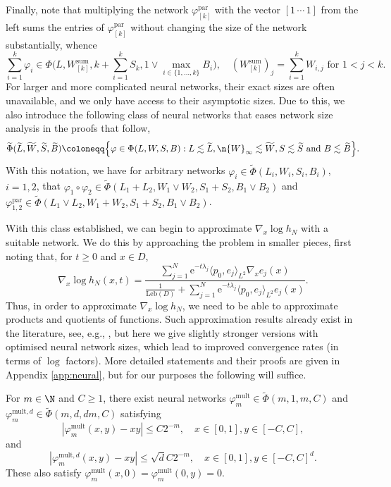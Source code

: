 \documentclass[a4paper, 11pt, headings = small, abstract]{scrartcl}
\begin{document}
Finally, note that multiplying the network $\varphi^{\mathrm{par}}_{[k]}$ with the vector $[1\, \cdots\, 1]$ from the left sums the entries of $\varphi^{\mathrm{par}}_{[k]}$ without changing the size of the network substantially, whence
\[
        \sum_{i=1}^k\varphi_i\in\Phi\Big(L, W^\mathrm{sum}_{[k]}, k+\sum_{i=1}^{k}S_k, 1\vee\max_{i\in\{1, \ldots, k\}}B_i\Big),
	\quad (W_{[k]}^\mathrm{sum})_j=\sum_{i=1}^{k}W_{i, j}\text{ for }1<j<k.
\]
For larger and more complicated neural networks, their exact sizes are often unavailable, and we only have access to their asymptotic sizes.
Due to this, we also introduce the following class of neural networks that eases network size analysis in the proofs that follow,
\[
    \widetilde{\Phi}(\widetilde{L}, \widetilde{W}, \widetilde{S}, \widetilde{B})
    \coloneqq \Big\{\varphi\in\Phi(L, W, S, B): L\lesssim\widetilde{L}, \n{W}_{\infty}\lesssim\widetilde{W}, S\lesssim\widetilde{S}\text{ and }B\lesssim\widetilde{B}\Big\}.
\]
With this notation, we have for arbitrary networks $\varphi_i\in\widetilde{\Phi}(L_i, W_i, S_i, B_i)$, $i=1,2$, that $\varphi_1\circ\varphi_2\in\widetilde{\Phi}(L_1+L_2, W_1\vee W_2, S_1+S_2, B_1\vee B_2)$ and $\varphi_{1, 2}^{\mathrm{par}}\in\widetilde{\Phi}(L_1\vee L_2, W_1+W_2, S_1+S_2, B_1\vee B_2)$.

With this class established, we can begin to approximate $\nabla_x\log h_N$ with a suitable network.
We do this by approaching the problem in smaller pieces, first noting that, for $t\ge0$ and $x\in D$,
\[
	\nabla_x\log h_N(x,t)
	=\frac{\sum_{j=1}^{N}\mathrm{e}^{-t\lambda_j}\langle p_0, e_j\rangle_{L^2}\nabla_xe_j(x)}{\frac{1}{\mathrm{Leb}(D)}+\sum_{j=1}^{N}\mathrm{e}^{-t\lambda_j}\langle p_0, e_j\rangle_{L^2} e_j(x)}.
\]
Thus, in order to approximate $\nabla_x\log h_N$, we need to be able to approximate products and quotients of functions.
Such approximation results already exist in the literature, see, e.g., \cite{oko23, schmidthieber20, telgarsky17, yarotsky17}, but here we give slightly stronger versions with optimised neural network sizes, which lead to improved convergence rates (in terms of $\log$ factors).
More detailed statements and their proofs are given in Appendix \ref{app:neural}, but for our purposes the following will suffice.

\begin{lemma}
	\label{lem:mult_network_asymp}
	For $m\in\N$ and $C\ge1$, there exist neural networks $\varphi_{m}^{\mathrm{mult}}\in\widetilde{\Phi}(m, 1, m, C)$ and $\varphi_{m}^{\mathrm{mult}, d}\in\widetilde{\Phi}(m, d, dm, C)$ satisfying
    \[
        |\varphi^{\mathrm{mult}}_m(x, y)-xy|
        \le C2^{-m},\quad x\in[0, 1],y\in[-C, C],
    \]
    and
    \[
        |\varphi^{\mathrm{mult}, d}_m(x, y)-xy|
        \le\sqrt{d}C2^{-m},\quad x\in[0, 1],y\in[-C, C]^d.
    \]
    These also satisfy $\varphi^{\mathrm{mult}}_m(x, 0)=\varphi^{\mathrm{mult}}_m(0, y)=0$.
\end{lemma}
\end{document}
